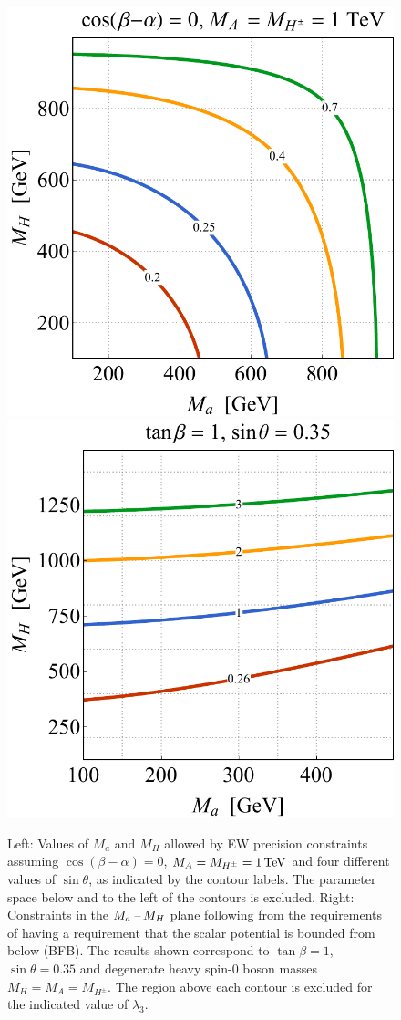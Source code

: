\documentclass[a4paper, 11pt,notoc]{article}
\begin{document}
\begin{figure}[t!]
\centering
\includegraphics[height=.45\textwidth]{figure4l.pdf} \qquad 
\includegraphics[height=.45\textwidth]{figure4r.pdf}
\vspace{4mm}
\caption{\label{fig:EWVAC} Left: Values of $M_a$ and $M_H$ allowed by EW precision constraints assuming $\cos(\beta-\alpha)=0$, $M_A= M_{H^\pm}=1 \, {\rm TeV}$ and four different values of $\sin \theta$, as indicated by the contour labels.  The parameter space below and to the left of the contours is excluded. Right: Constraints in the $M_{a}\hspace{0.5mm}$--$\hspace{0.5mm} M_H$ plane following from the  requirements of having a requirement that the scalar potential is bounded from below (BFB). The  results shown correspond to $\tan \beta = 1$, $\sin \theta = 0.35$ and degenerate heavy spin-0 boson masses $M_H = M_A = M_{H^\pm}$. The region above  each contour  is excluded for the indicated value of $\lambda_3$.}  
\end{figure}
\end{document}
